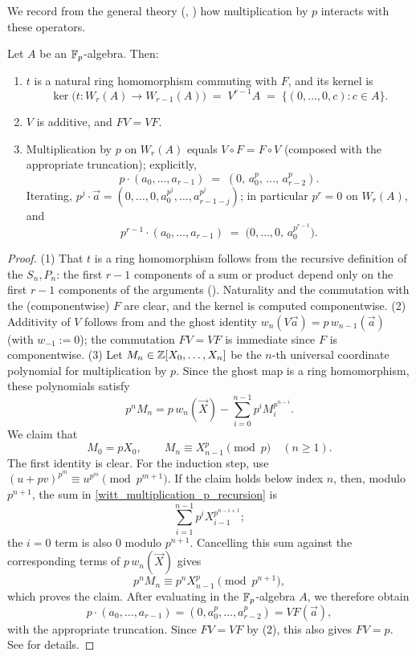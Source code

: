 We record from the general theory (\cite[II, \S6]{serreLF},
\cite[\S2]{Rabinoff2014Witt}) how multiplication by $p$ interacts with these
operators.

\begin{prop}\label{prop:witt_multiplication_by_p}
Let $A$ be an $\mathbb{F}_p$-algebra. Then:
\begin{enumerate}
    \item $t$ is a natural ring homomorphism commuting with $F$, and its kernel is
    \[
    \ker\bigl(t \colon W_r(A) \to W_{r-1}(A)\bigr)
    \;=\; V^{r-1} A \;=\; \{(0, \dots, 0, c) : c \in A\}.
    \]
    \item $V$ is additive, and $F V = V F$.
    \item Multiplication by $p$ on $W_r(A)$ equals $V \circ F = F \circ V$
    (composed with the appropriate truncation); explicitly,
    \[
    p \cdot (a_0, \dots, a_{r-1}) \;=\; (0,\, a_0^p,\, \dots,\, a_{r-2}^p).
    \]
    Iterating, $p^j \cdot \vec a = (0, \dots, 0, a_0^{p^j}, \dots, a_{r-1-j}^{p^j})$;
    in particular $p^r = 0$ on $W_r(A)$, and
    \begin{equation}\label{eq:witt_p_to_r_minus_1}
    p^{r-1} \cdot (a_0, \dots, a_{r-1}) \;=\; \bigl(0, \dots, 0,\, a_0^{p^{r-1}}\bigr).
    \end{equation}
\end{enumerate}
\end{prop}

\begin{proof}
(1) That $t$ is a ring homomorphism follows from the recursive definition of the
$S_n, P_n$: the first $r-1$ components of a sum or product depend only on the first
$r-1$ components of the arguments (). Naturality and
the commutation with the (componentwise) $F$ are clear, and the kernel is computed
componentwise. (2) Additivity of $V$ follows from  and
the ghost identity $w_n(V\vec a) = p\, w_{n-1}(\vec a)$ (with $w_{-1} := 0$); the
commutation $FV = VF$ is immediate since $F$ is componentwise. (3) Let
$M_n\in\mathbb{Z}[X_0,\dots,X_n]$ be the $n$-th universal coordinate polynomial for
multiplication by $p$. Since the ghost map is a ring homomorphism, these
polynomials satisfy
\begin{equation}\label{eq:witt_multiplication_p_recursion}
 p^nM_n
 =p\,w_n(\vec X)-\sum_{i=0}^{n-1}p^iM_i^{p^{n-i}}.
\end{equation}
We claim that
\[
 M_0=pX_0,
 \qquad
 M_n\equiv X_{n-1}^p\pmod p\quad(n\geq1).
\]
The first identity is clear. For the induction step, use
$(u+pv)^{p^m}\equiv u^{p^m}\pmod{p^{m+1}}$. If the claim holds below index $n$,
then, modulo $p^{n+1}$, the sum in
\eqref{witt_multiplication_p_recursion} is
\[
 \sum_{i=1}^{n-1}p^iX_{i-1}^{p^{n-i+1}};
\]
the $i=0$ term is also $0$ modulo $p^{n+1}$. Cancelling this sum against the
corresponding terms of $p\,w_n(\vec X)$ gives
\[
 p^nM_n\equiv p^nX_{n-1}^p\pmod{p^{n+1}},
\]
which proves the claim. After evaluating in the $\mathbb{F}_p$-algebra $A$, we therefore
obtain
\[
 p\cdot(a_0,\dots,a_{r-1})=(0,a_0^p,\dots,a_{r-2}^p)=VF(\vec a),
\]
with the appropriate truncation. Since $FV=VF$ by (2), this also gives $FV=p$.
See \cite[II, \S6]{serreLF} for details.
\end{proof}

